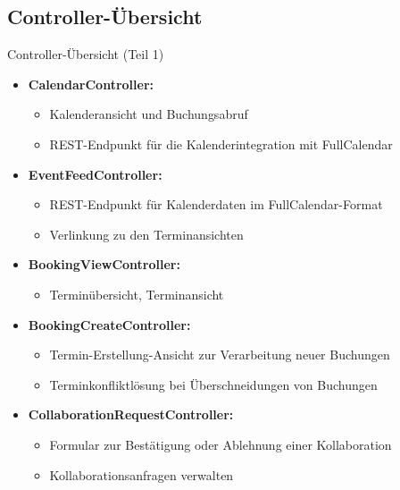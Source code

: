 \documentclass{sdqbeamer}
\begin{document}
\subsection{Controller-Übersicht}

\begin{frame}{Controller-Übersicht (Teil 1)}
    \begin{itemize}
        \item \textbf{CalendarController:}
        \begin{itemize}
            \item Kalenderansicht und Buchungsabruf
            \item REST-Endpunkt für die Kalenderintegration mit FullCalendar
        \end{itemize}
        \item \textbf{EventFeedController:}
        \begin{itemize}
            \item REST-Endpunkt für Kalenderdaten im FullCalendar-Format
            \item Verlinkung zu den Terminansichten
        \end{itemize}
        \item \textbf{BookingViewController:}
        \begin{itemize}
            \item Terminübersicht, Terminansicht
        \end{itemize}
        \item \textbf{BookingCreateController:}
        \begin{itemize}
            \item Termin-Erstellung-Ansicht zur Verarbeitung neuer Buchungen
            \item Terminkonfliktlösung bei Überschneidungen von Buchungen
        \end{itemize}
        \item \textbf{CollaborationRequestController:}
        \begin{itemize}
            \item Formular zur Bestätigung oder Ablehnung einer Kollaboration
            \item Kollaborationsanfragen verwalten
        \end{itemize}
    \end{itemize}
\end{frame}
\end{document}
